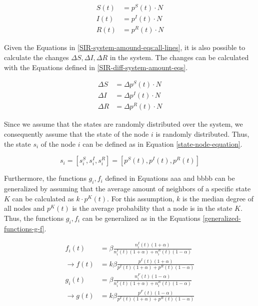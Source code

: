 \begin{subequations}
\begin{align}
    S(t) &=p^S(t)\cdot N \label{SIR-system-amound-eqs:1}\\
    I(t) &=p^I(t)\cdot N \label{SIR-system-amound-eqs:2}\\
    R(t) &=p^R(t)\cdot N \label{SIR-system-amound-eqs:3}
\end{align}
\label{SIR-system-amound-eqs:all-lines}
\end{subequations}

Given the Equations in \ref{SIR-system-amound-eqs:all-lines}, it is also possible 
to calculate the changes $\Delta S, \Delta I, \Delta R$ in the system.
The changes can be calculated with the Equations defined in 
\ref{SIR-diff-system-amount-eqs}.

\begin{subequations}
\begin{align}
    \Delta S &=\Delta p^S(t)\cdot N \label{SIR-diff-system-amount-eqs:1}\\
    \Delta I &=\Delta p^I(t)\cdot N \label{SIR-diff-system-amount-eqs:2}\\
    \Delta R &=\Delta p^R(t)\cdot N \label{SIR-diff-system-amount-eqs:3}
\end{align}
\label{SIR-diff-system-amount-eqs}
\end{subequations}

Since we assume that the states are randomly distributed over the system, 
we consequently assume that the state of the node $i$ is randomly distributed.
Thus, the state $s_i$ of the node $i$ can be defined as in Equation 
\ref{state-node-equation}.

\begin{equation}
    s_i = [s_i^S, s_i^I, s_i^R] = [p^S(t), p^I(t), p^R(t)]
    \label{state-node-equation}
\end{equation}

Furthermore, the functions $g_i,f_i$ defined in Equations aaa and bbbb
can be generalized by assuming that the average amount of neighbors 
of a specific state $K$ can be calculated as $k\cdot p^K(t)$. For this
assumption, $k$ is the median degree of all nodes and $p^K(t)$ is the 
average probability that a node is in the state $K$.
Thus, the functions $g_i,f_i$ can be generalized as in the
Equations \ref{generalized-functions-g-f}.

\begin{subequations}
\begin{align}
    f_i(t) &= \beta \frac{n_i^I(t)(1+\alpha)}{n_i^I(t)(1+\alpha)+n_i^R(t)(1-\alpha)} 
    \nonumber\\
    \to f(t) &= k\beta \frac{p^I(t)(1+\alpha)}{p^I(t)(1+\alpha)+p^R(t)(1-\alpha)}
    \label{generalized-function-f} \\
    g_i(t) &= \beta \frac{n_i^F(t)(1-\alpha)}{n_i^I(t)(1+\alpha)+n_i^R(t)(1-\alpha)} 
    \nonumber \\
    \to g(t) &= k\beta \frac{p^F(t)(1-\alpha)}{p^I(t)(1+\alpha)+p^R(t)(1-\alpha)}
    \label{generalized-function-g}
\end{align}
\label{generalized-functions-g-f}
\end{subequations}

